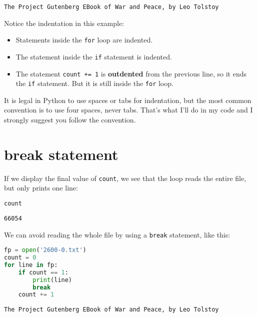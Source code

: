 \begin{lstlisting}[style=output]
The Project Gutenberg EBook of War and Peace, by Leo Tolstoy
\end{lstlisting}

Notice the indentation in this example:

\begin{itemize}
\item
  Statements inside the \passthrough{\lstinline!for!} loop are indented.
\item
  The statement inside the \passthrough{\lstinline!if!} statement is
  indented.
\item
  The statement \passthrough{\lstinline!count += 1!} is
  \textbf{outdented} from the previous line, so it ends the
  \passthrough{\lstinline!if!} statement. But it is still inside the
  \passthrough{\lstinline!for!} loop.
\end{itemize}

It is legal in Python to use spaces or tabs for indentation, but the
most common convention is to use four spaces, never tabs. That's what
I'll do in my code and I strongly suggest you follow the convention.

\hypertarget{break-statement}{%
\section{break statement}\label{break-statement}}

If we display the final value of \passthrough{\lstinline!count!}, we see
that the loop reads the entire file, but only prints one line:

\begin{lstlisting}[language=Python,style=source]
count
\end{lstlisting}

\begin{lstlisting}[style=output]
66054
\end{lstlisting}

We can avoid reading the whole file by using a
\passthrough{\lstinline!break!} statement, like this:

\begin{lstlisting}[language=Python,style=source]
fp = open('2600-0.txt')
count = 0
for line in fp:
    if count == 1:
        print(line)
        break
    count += 1
\end{lstlisting}

\begin{lstlisting}[style=output]
The Project Gutenberg EBook of War and Peace, by Leo Tolstoy
\end{lstlisting}

